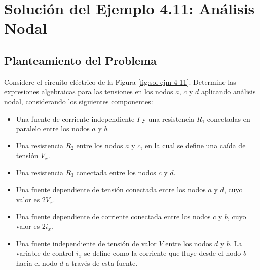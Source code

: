 \documentclass[12pt, a4paper]{article}
\begin{document}
\section*{Solución del Ejemplo 4.11: Análisis Nodal}

\subsection*{Planteamiento del Problema}
Considere el circuito eléctrico de la Figura \ref{fig:sol-ejm-4-11}. Determine las expresiones algebraicas para las tensiones en los nodos $a$, $c$ y $d$ aplicando análisis nodal, considerando los siguientes componentes:
\begin{itemize}
    \item Una fuente de corriente independiente $I$ y una resistencia $R_1$ conectadas en paralelo entre los nodos $a$ y $b$.
    \item Una resistencia $R_2$ entre los nodos $a$ y $c$, en la cual se define una caída de tensión $V_x$.
    \item Una resistencia $R_3$ conectada entre los nodos $c$ y $d$.
    \item Una fuente dependiente de tensión conectada entre los nodos $a$ y $d$, cuyo valor es $2V_x$.
    \item Una fuente dependiente de corriente conectada entre los nodos $c$ y $b$, cuyo valor es $2i_x$.
    \item Una fuente independiente de tensión de valor $V$ entre los nodos $d$ y $b$. La variable de control $i_x$ se define como la corriente que fluye desde el nodo $b$ hacia el nodo $d$ a través de esta fuente.
\end{itemize}
\end{document}
